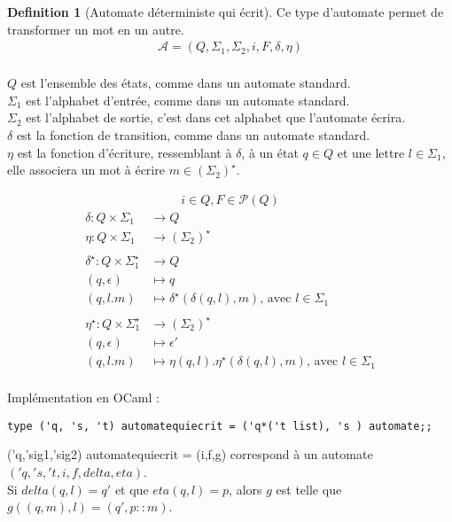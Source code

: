 \documentclass{article}
\theoremstyle{definition}
\newtheorem{definition}{Definition}[section]
\newcommand{\codecml}[1]{\colorbox{backcolour}{\fontfamily{phv}\selectfont #1}}
\begin{document}
\begin{definition}[Automate déterministe qui écrit]
Ce type d'automate permet de transformer un mot en un autre.\\

\begin{gather*}
    \mathcal{A} = (Q,\Sigma_1 ,\Sigma_2, i, F, \delta, \eta) \\
\end{gather*}

$Q$ est l'ensemble des \'etats, comme dans un automate standard.\\
$\Sigma_1$ est l'alphabet d'entr\'ee, comme dans un automate standard.\\
$\Sigma_2$ est l'alphabet de sortie, c'est dans cet alphabet que l'automate \'ecrira.\\
$\delta$ est la fonction de transition, comme dans un automate standard.\\
$\eta$ est la fonction d'\'ecriture, ressemblant \`a $\delta$, \`a un \'etat $q\in Q$ et une lettre $l \in \Sigma_1$, elle associera un mot \`a \'ecrire $m \in (\Sigma_2)^\star$.

\begin{gather*}
    i\in Q,F \in \mathcal{P} (Q)
\end{gather*}
\begin{align*}
    \delta : Q\times \Sigma_1 &\rightarrow Q \\
    \eta : Q\times \Sigma_1 &\rightarrow (\Sigma_2 )^\star\\
    \\
    \delta^\star : Q\times \Sigma_1 ^\star &\rightarrow Q \\
    (q,\epsilon) &\mapsto q\\
    (q,l.m) &\mapsto \delta^\star(\delta(q,l),m)\text{, avec }l\in \Sigma_1\\
    \\
    \eta^\star : Q\times \Sigma_1 ^\star &\rightarrow (\Sigma_2)^\star \\
    (q,\epsilon) &\mapsto \epsilon '\\
    (q,l.m) &\mapsto \eta(q,l).\eta^\star(\delta(q,l),m)\text{, avec }l\in \Sigma_1\\
\end{align*}

\end{definition}
Impl\'ementation en OCaml :
\begin{lstlisting}
type ('q, 's, 't) automatequiecrit = ('q*('t list), 's ) automate;;
\end{lstlisting}
\codecml{('q,'sig1,'sig2) automatequiecrit = (i,f,g)} correspond \`a un automate $('q,'s,'t,i,f,delta,eta)$. \\
Si $delta(q,l)=q'$ et que $eta(q,l)=p$, alors $g$ est telle que $g((q,m),l) = (q',p::m)$.
\end{document}
